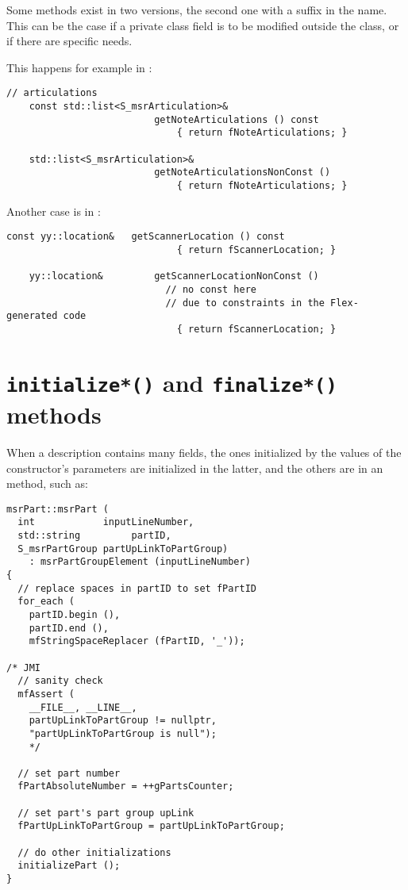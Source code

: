 Some methods exist in two versions, the second one with a  suffix in the name. This can be the case if a private class   field is to be modified outside the class, or if there are specific needs.

This happens for example in :
\begin{lstlisting}[language=CPlusPlus]
    // articulations
    const std::list<S_msrArticulation>&
                          getNoteArticulations () const
                              { return fNoteArticulations; }

    std::list<S_msrArticulation>&
                          getNoteArticulationsNonConst ()
                              { return fNoteArticulations; }
\end{lstlisting}

Another case is in :
\begin{lstlisting}[language=CPlusPlus]
    const yy::location&   getScannerLocation () const
                              { return fScannerLocation; }

    yy::location&         getScannerLocationNonConst ()
                            // no const here
                            // due to constraints in the Flex-generated code
                              { return fScannerLocation; }
\end{lstlisting}


\section{{\tt initialize*()} and {\tt finalize*()} methods}

When a description contains many fields, the ones initialized by the values of the constructor's parameters are initialized in the latter, and the others are in an  method, such as:
\begin{lstlisting}[language=CPlusPlus]
msrPart::msrPart (
  int            inputLineNumber,
  std::string         partID,
  S_msrPartGroup partUpLinkToPartGroup)
    : msrPartGroupElement (inputLineNumber)
{
  // replace spaces in partID to set fPartID
  for_each (
    partID.begin (),
    partID.end (),
    mfStringSpaceReplacer (fPartID, '_'));

/* JMI
  // sanity check
  mfAssert (
    __FILE__, __LINE__,
    partUpLinkToPartGroup != nullptr,
    "partUpLinkToPartGroup is null");
    */

  // set part number
  fPartAbsoluteNumber = ++gPartsCounter;

  // set part's part group upLink
  fPartUpLinkToPartGroup = partUpLinkToPartGroup;

  // do other initializations
  initializePart ();
}
\end{lstlisting}

